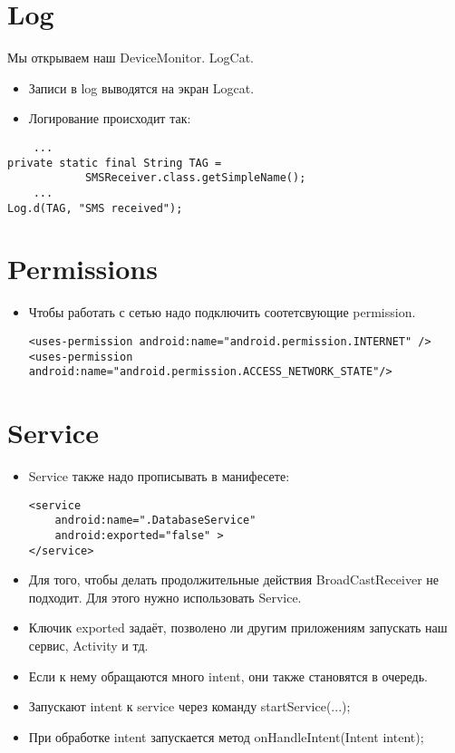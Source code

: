 \documentclass[12 pt]{article}
\begin{document}
\section{Log}
    Мы открываем наш DeviceMonitor. LogCat.     
    \begin{itemize}
        \item Записи в log выводятся на экран Logcat.
        \item Логирование происходит так:
    \end{itemize}
    \begin{lstlisting}
    ...
private static final String TAG = 
            SMSReceiver.class.getSimpleName();
    ...
Log.d(TAG, "SMS received");    
    \end{lstlisting}

\section{Permissions}
    \begin{itemize}
        \item Чтобы работать с сетью надо подключить соотетсвующие permission.
        \begin{lstlisting}
<uses-permission android:name="android.permission.INTERNET" /> 
<uses-permission  android:name="android.permission.ACCESS_NETWORK_STATE"/>        
        \end{lstlisting}
    \end{itemize}
    \section{Service}    
    \begin{itemize}
        \item Service также надо прописывать в манифесете:
        \begin{lstlisting}
<service
    android:name=".DatabaseService"
    android:exported="false" >
</service>        
        \end{lstlisting}
        \item Для того, чтобы делать продолжительные действия BroadCastReceiver не подходит. Для этого нужно использовать Service.
        \item Ключик exported задаёт, позволено ли другим приложениям запускать наш сервис, Activity и тд.
        \item Если к нему обращаются много intent, они также становятся в очередь.
        \item Запускают intent к service через команду startService(...);
        \item При обработке intent запускается метод onHandleIntent(Intent intent);
    \end{itemize}
\end{document}
